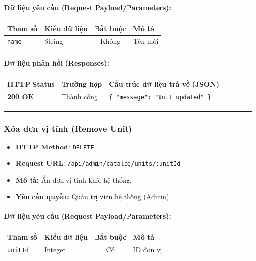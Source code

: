 \documentclass[12pt,a4paper]{article}
\begin{document}
\paragraph{Dữ liệu yêu cầu (Request Payload/Parameters):}
\begin{longtable}{|p{2.8cm}|p{2.2cm}|c|p{7.0cm}|}
\hline
\textbf{Tham số} & \textbf{Kiểu dữ liệu} & \textbf{Bắt buộc} & \textbf{Mô tả} \\ \hline
\endhead
\texttt{name} & String & Không & Tên mới \\ \hline
\end{longtable}

\paragraph{Dữ liệu phản hồi (Responses):}
\begin{longtable}{|p{2.8cm}|p{3.2cm}|p{8.0cm}|}
\hline
\textbf{HTTP Status} & \textbf{Trường hợp} & \textbf{Cấu trúc dữ liệu trả về (JSON)} \\ \hline
\endhead
\textbf{200 OK} & Thành công & \texttt{\{ "message": "Unit updated" \}} \\ \hline
\end{longtable}

\vskip 0.4cm
\noindent\rule{\textwidth}{0.3pt}
\vskip 0.4cm

\subsubsection{Xóa đơn vị tính (Remove Unit)}
\begin{itemize}[leftmargin=*]
    \item \textbf{HTTP Method:} \texttt{DELETE}
    \item \textbf{Request URL:} \texttt{/api/admin/catalog/units/:unitId}
    \item \textbf{Mô tả:} Ẩn đơn vị tính khỏi hệ thống.
    \item \textbf{Yêu cầu quyền:} Quản trị viên hệ thống (Admin).
\end{itemize}

\paragraph{Dữ liệu yêu cầu (Request Payload/Parameters):}
\begin{longtable}{|p{2.8cm}|p{2.2cm}|c|p{7.0cm}|}
\hline
\textbf{Tham số} & \textbf{Kiểu dữ liệu} & \textbf{Bắt buộc} & \textbf{Mô tả} \\ \hline
\endhead
\texttt{unitId} & Integer & Có & ID đơn vị \\ \hline
\end{longtable}
\end{document}
